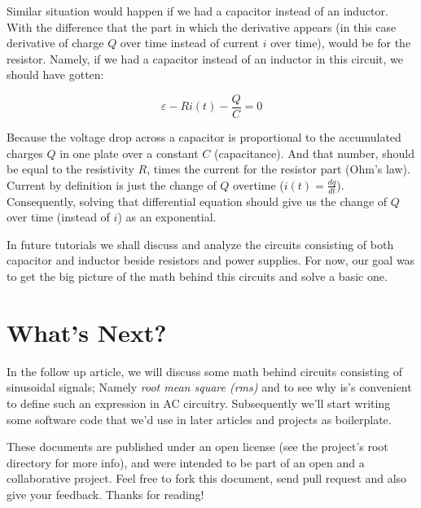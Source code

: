 \documentclass{article}
\begin{document}
	Similar situation would happen if we had a capacitor instead of an inductor. With the difference that the part in which the derivative appears (in this case derivative of charge $Q$ over time instead of current $i$ over time), would be for the resistor. Namely, if we had a capacitor instead of an inductor in this circuit, we should have gotten:
	
	$$\varepsilon - Ri(t) - \frac{Q}{C} = 0 $$
	
	Because the voltage drop across a capacitor is proportional to the accumulated charges $Q$ in one plate over a constant $C$ (capacitance). And that number, should be equal to the resistivity  $R$, times the current for the resistor part (Ohm's law). Current by definition is just the change of $Q$ overtime ($i(t) = \frac{dq}{dt}$). Consequently, solving that differential equation should give us the change of $Q$ over time (instead of $i$) as an exponential.
	
	In future tutorials we shall discuss and analyze the circuits consisting of both capacitor and inductor beside resistors and power supplies. For now, our goal was to get the big picture of the math behind this circuits and solve a basic one.
	
	\section{What's Next?}
	In the follow up article, we will discuss some math behind circuits consisting of sinusoidal signals; Namely \textit{root mean square (rms)} and to see why is's convenient to define such an expression in AC circuitry. Subsequently we'll start writing some software code that we'd use in later articles and projects as boilerplate.
	
	These documents are published under an open license (see the project's root directory for more info), and were intended to be part of an open and a collaborative project. Feel free to fork this document, send pull request and also give your feedback. Thanks for reading!
	
\end{document}
